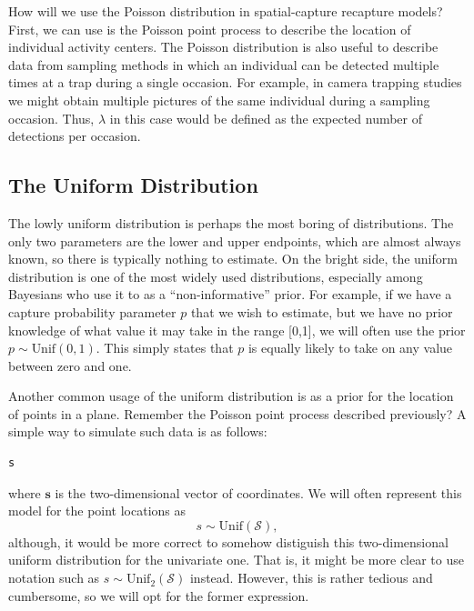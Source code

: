 How will we use the Poisson distribution in spatial-capture recapture
models? First, we can use is the Poisson point process to describe the
location of individual activity centers. The Poisson distribution is
also useful to describe data from sampling methods in which an
individual can be detected multiple times at a trap during a single
occasion. For example, in camera trapping studies we might obtain
multiple pictures of the same individual during a sampling
occasion. Thus, $\lambda$ in this case would be defined as the
expected number of detections per occasion.



\subsection{The Uniform Distribution}

The lowly uniform distribution is perhaps the most boring of
distributions.
The only two parameters are the lower and upper endpoints,
which are almost always known, so there is typically nothing to
estimate. On the bright side, the uniform
distribution is one of the most widely used distributions,
especially among Bayesians who use it to as a ``non-informative''
prior. %
For example, if we
have a capture probability parameter $p$ that we wish to estimate, but
we have no prior knowledge of what value it may take in the range
[0,1], we will often use the prior $p \sim \text{Unif}(0,1)$. This
simply states that $p$ is equally likely to take on any value between
zero and one.

Another common usage of the uniform distribution is as a prior for the
location of points in a plane. Remember the Poisson point process
described previously? A simple way to simulate such data is as
follows:
\begin{verbatim}
s
\end{verbatim}
where $\mathbf{s}$ is the two-dimensional vector of
coordinates. We will often represent this model for the point
locations as
\begin{equation}
  s \sim \text{Unif}(\mathcal{S}),
\end{equation}
although, it would be more correct to somehow distiguish this
two-dimensional uniform distribution for the univariate one. That is,
it might be more clear to use notation such as
$s \sim \text{Unif}_2(\mathcal{S})$ instead. However, this is rather
tedious and cumbersome, so we will opt for the former expression.

